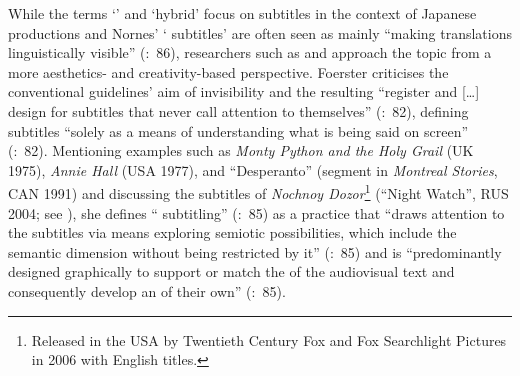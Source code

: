 While the terms ‘’ and ‘hybrid’ focus on subtitles in the context of Japanese productions and Nornes’ ‘ subtitles’ are often seen as mainly “making translations linguistically visible” (\citealt{Foerster2010}:~86), researchers such as \citet{Foerster2010} and \citet{mcclarty2012} approach the topic from a more aesthetics- and creativity-based perspective. Foerster criticises the conventional guidelines’ aim of invisibility and the resulting “register and […] design for subtitles that never call attention to themselves” (\citealt{Foerster2010}:~82), defining subtitles “solely as a means of understanding what is being said on screen” (\citeyear{Foerster2010}:~82). Mentioning examples such as \textit{Monty Python and the Holy Grail} (UK 1975), \textit{Annie Hall} (USA 1977), and “Desperanto” (segment in \textit{Montreal Stories}, CAN 1991) and discussing the subtitles of \textit{Nochnoy Dozor}\footnote{Released in the USA by Twentieth Century Fox and Fox Searchlight Pictures in 2006 with English titles.} (“Night Watch”, RUS 2004; see ), she defines “ subtitling” (\citeyear{Foerster2010}:~85) as a practice that “draws attention to the subtitles via  means exploring semiotic possibilities, which include the semantic dimension without being restricted by it” (\citeyear{Foerster2010}:~85) and is “predominantly designed graphically to support or match the  of the audiovisual text and consequently develop an  of their own” (\citeyear{Foerster2010}:~85). 

